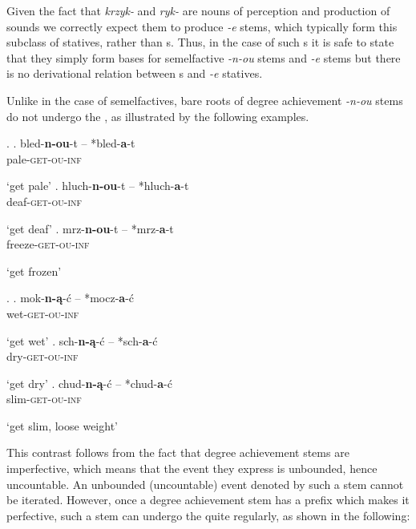 Given the fact that \textit{krzyk-} and \textit{ryk-} are nouns of perception and production of sounds we correctly expect them to produce \textit{-e} stems, which typically form this subclass of statives, rather than s. Thus, in the case of such s it is safe to state that they simply form bases for semelfactive \textit{-n-ou} stems and \textit{-e} stems but there is no derivational relation between s and \textit{-e} statives.
\par
Unlike in the case of semelfactives, bare roots of degree achievement \textit{-n-ou} stems do not undergo the  , as illustrated by the following examples.

\ex.  
\ag.	
{bled-\textbf{n-ou}-t} -- *bled-\textbf{a}-t\\
{pale-\textsc{get-ou}-\textsc{inf}}\\
\strut `get pale'
\bg. 
{hluch-\textbf{n-ou}-t} -- *hluch-\textbf{a}-t\\
{deaf-\textsc{get-ou}-\textsc{inf}}\\
\strut `get deaf'
\cg. 
{mrz-\textbf{n-ou}-t} -- *mrz-\textbf{a}-t\\
{freeze-\textsc{get-ou}-\textsc{inf}}\\
\strut `get frozen'

\ex. \label{Pol:da:not}
\ag.	
{mok-\textbf{n-\k{a}}-\'c} -- *mocz-\textbf{a}-\'c\\
{wet-\textsc{get-ou}-\textsc{inf}}\\
\strut`get wet'
\bg.
{sch-\textbf{n-\k{a}}-\'c} -- *sch-\textbf{a}-\'c \\
{dry-\textsc{get-ou}-\textsc{inf}}\\
\strut `get dry'
\cg.
{chud-\textbf{n-\k{a}}-\'c} -- *chud-\textbf{a}-\'c \\
{slim-\textsc{get-ou}-\textsc{inf}}\\
\strut `get slim, loose weight'

\noindent
This contrast follows from the fact that  degree achievement stems are imperfective, which means that the event they express is unbounded, hence uncountable. An unbounded (uncountable) event denoted by such a stem cannot be iterated. However, once a degree achievement stem has a prefix which makes it perfective, such a stem can undergo the   quite regularly, as shown in the following: 


